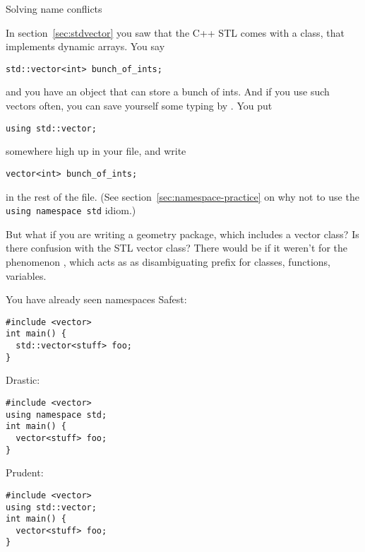 
 {Solving name conflicts}
\label{sec:usename}

In section~\ref{sec:stdvector} you saw that the C++ \ac{STL} comes with
a  class, that implements dynamic arrays. You say
\begin{lstlisting}
std::vector<int> bunch_of_ints;
\end{lstlisting}
and you have an object that can store a bunch of ints. And if you use
such vectors often, you can save yourself some typing by 
.
You put
\begin{lstlisting}
using std::vector;
\end{lstlisting}
somewhere high up in your file, and write
\begin{lstlisting}
vector<int> bunch_of_ints;
\end{lstlisting}
in the rest of the file.
(See section~\ref{sec:namespace-practice}
on why not to use the \lstinline{using namespace std} idiom.)

But what if you are writing a geometry package, which includes a
vector class? Is there confusion with the \ac{STL} vector class?
There would be if it weren't for the phenomenon
, which acts as as disambiguating prefix for
classes, functions, variables.

\begin{slide}{You have already seen namespaces}
  \label{sl:vec-namespace}
  Safest:
\begin{lstlisting}
#include <vector>
int main() {
  std::vector<stuff> foo;
}
\end{lstlisting}
\begin{multicols}{2}
  Drastic:
\begin{lstlisting}
#include <vector>
using namespace std;
int main() {
  vector<stuff> foo;
}
\end{lstlisting}
\vfill\columnbreak
Prudent:
\begin{lstlisting}
#include <vector>
using std::vector;
int main() {
  vector<stuff> foo;
}
\end{lstlisting}
\end{multicols}
\end{slide}

